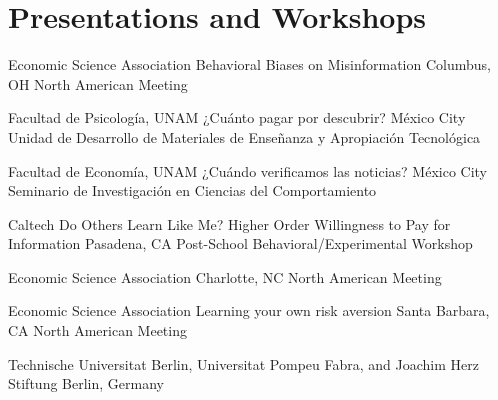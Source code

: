 \section{Presentations and Workshops}



{Economic Science Association}
{Behavioral Biases on Misinformation}
{Columbus, OH}
{}
{North American Meeting}


{Facultad de Psicología, UNAM}
{¿Cuánto pagar por descubrir?}
{México City}
{}
{Unidad de Desarrollo de Materiales de Enseñanza y Apropiación Tecnológica}

{Facultad de Economía, UNAM}
{¿Cuándo verificamos las noticias?}
{México City}
{}
{Seminario de Investigación en Ciencias del Comportamiento }

{Caltech}
{Do Others Learn Like Me? Higher Order Willingness to Pay for Information}
{Pasadena, CA}
{}
{Post-School Behavioral/Experimental Workshop}


{Economic Science Association}
{
}
{Charlotte, NC}
{}
{North American Meeting}

{Economic Science Association}
{Learning your own risk aversion}
{Santa Barbara, CA}
{}
{North American Meeting}

{Technische Universitat Berlin, Universitat Pompeu Fabra, and Joachim Herz Stiftung}
{}
{Berlin, Germany}
{}
{}
